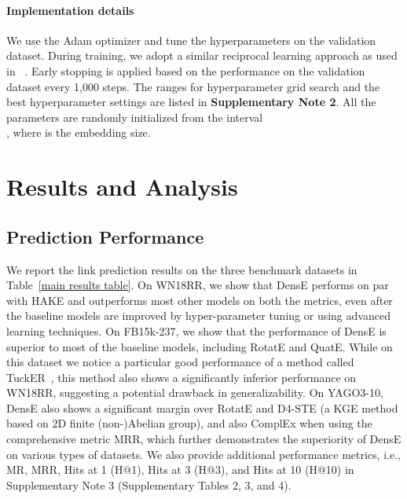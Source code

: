 \documentclass[11pt]{article}
\begin{document}
\paragraph{Implementation details} We use the Adam optimizer and tune the hyperparameters on the validation dataset. During training, we adopt a similar reciprocal learning approach as used in ~\cite{Lacroix2018CanonicalTD, zhang2019quaternion}. Early stopping is applied based on the performance on the validation dataset every 1,000 steps. The ranges for hyperparameter grid search and the best hyperparameter settings are listed in \textbf{Supplementary Note 2}. All the parameters are randomly initialized from the interval \\
, where  is the embedding size. 

\section{Results and Analysis}
\subsection{Prediction Performance} We report the link prediction results on the three benchmark datasets in Table~\ref{main results table}. 
On WN18RR, we show that DensE performs on par with HAKE and outperforms most other models on both the metrics, even after the baseline models are improved by hyper-parameter tuning or using advanced learning techniques. 
On FB15k-237, we show that the performance of DensE is superior to most of the baseline models, including RotatE and QuatE. While on this dataset we notice a particular good performance of a method called TuckER~\cite{balavzevic2019tucker}, this method also shows a significantly inferior performance on WN18RR, suggesting a potential drawback in generalizability. 
On YAGO3-10, DensE also shows a significant margin over RotatE and D4-STE (a KGE method based on 2D finite (non-)Abelian group), and also ComplEx when using the comprehensive metric MRR, which further demonstrates the superiority of DensE on various types of datasets. We also provide additional performance metrics, i.e., MR, MRR, Hits at 1 (H@1), Hits at 3 (H@3), and Hits at 10 (H@10) in Supplementary Note 3 (Supplementary Tables 2, 3, and 4).
\end{document}
